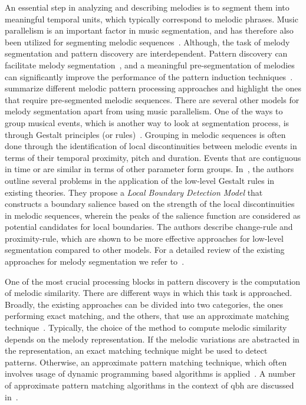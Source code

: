 An essential step in analyzing and describing melodies is to segment them into meaningful temporal units, which typically correspond to melodic phrases. Music parallelism is an important factor in music segmentation, and has therefore also been utilized for segmenting melodic sequences~\citep{Cambouropoulos2006}. Although, the task of melody segmentation and pattern discovery are interdependent. Pattern discovery can facilitate melody segmentation~\citep{Cambouropoulos2006}, and a meaningful pre-segmentation of melodies can significantly improve the performance of the pattern induction techniques~\citep{hiraga1997structural}. \cite{cambouropoulos2001pattern} summarize different melodic pattern processing approaches and highlight the ones that require pre-segmented melodic sequences. There are several other models for melody segmentation apart from using music parallelism. One of the ways to group musical events, which is another way to look at segmentation process, is through Gestalt principles (or rules)~\citep{Lerdahl1983,tenney1980temporal}. Grouping in melodic sequences is often done through the identification of local discontinuities between melodic events in terms of their temporal proximity, pitch and duration. Events that are contiguous in time or are similar in terms of other parameter form groups. In~\cite{cambouropoulos1996formal,cambouropoulos2001local}, the authors outline several problems in the application of the low-level Gestalt rules in existing theories. They propose a \textit{Local Boundary Detection Model} that constructs a boundary salience based on the strength of the local discontinuities in melodic sequences, wherein the peaks of the salience function are considered as potential candidates for local boundaries. The authors describe change-rule and proximity-rule, which are shown to be more effective approaches for low-level segmentation compared to other models. For a detailed review of the existing approaches for melody segmentation we refer to~\cite{cambouropoulos2001pattern}.

One of the most crucial processing blocks in pattern discovery is the computation of melodic similarity. There are different ways in which this task is approached. Broadly, the existing approaches can be divided into two categories, the ones performing exact matching, and the others, that use an approximate matching technique~\citep{cambouropoulos2001pattern}. Typically, the choice of the method to compute melodic similarity depends on the melody representation. If the melodic variations are abstracted in the representation, an exact matching technique might be used to detect patterns. Otherwise, an approximate pattern matching technique, which often involves usage of dynamic programming based algorithms is applied~\citep{rolland1999discovering}. A number of approximate pattern matching algorithms in the context of \gls{qbh} are discussed in~. 

